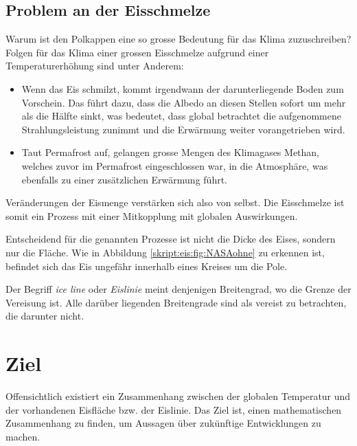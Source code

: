 \begin{refsection}
\subsection{Problem an der Eisschmelze} \label{skript:eis:Problem an der Eisschmelze}
Warum ist den Polkappen eine so grosse Bedeutung für das Klima zuzuschreiben? Folgen für das Klima einer grossen Eisschmelze aufgrund einer Temperaturerhöhung sind unter Anderem: 
\begin{itemize}
	\item Wenn das Eis schmilzt, kommt irgendwann der darunterliegende Boden zum Vorschein. Das führt dazu, dass die Albedo an diesen Stellen sofort um mehr als die Hälfte sinkt, was bedeutet, dass global betrachtet die aufgenommene Strahlungsleistung zunimmt und die Erwärmung weiter vorangetrieben wird.
	\item Taut Permafrost auf, gelangen grosse Mengen des Klimagases Methan, welches zuvor im Permafrost eingeschlossen war, in die Atmosphäre, was ebenfalls zu einer zusätzlichen Erwärmung führt.
\end{itemize}
Veränderungen der Eismenge verstärken sich also von selbst.
Die Eisschmelze ist somit ein Prozess mit einer Mitkopplung mit globalen Auswirkungen.

Entscheidend für die genannten Prozesse ist nicht die Dicke des Eises, sondern nur die Fläche. Wie in Abbildung \ref{skript:eis:fig:NASAohne} zu erkennen ist, befindet sich das Eis ungefähr innerhalb eines Kreises um die Pole.
\begin{definition}
	Der Begriff {\em ice line} oder {\em Eislinie} meint denjenigen Breitengrad, wo die Grenze der Vereisung ist.
	Alle darüber liegenden Breitengrade sind als vereist zu betrachten, die darunter nicht.
	\label{skript:def:iceline}
\end{definition}
\section{Ziel}
Offensichtlich existiert ein Zusammenhang zwischen der globalen Temperatur und der vorhandenen Eisfläche bzw. der Eislinie. Das Ziel ist, einen mathematischen Zusammenhang zu finden, um Aussagen über zukünftige Entwicklungen zu machen.

\end{refsection}
